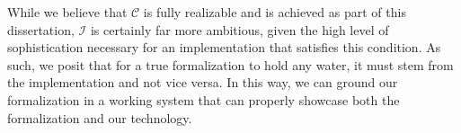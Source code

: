 While we believe that $\mathcal{C}$ is fully realizable and is
achieved as part of this dissertation, $\mathcal{I}$ is certainly far
more ambitious, given the high level of sophistication necessary for
an implementation that satisfies this condition. As such, we posit
that for a true formalization to hold any water, it must stem from the
implementation and not vice versa. In this way, we can ground our
formalization in a working system that can properly showcase both the
formalization and our technology.

\begin{comment}
\footnote{This condition may not strictly be realizable,
        but the goal is to at a minimum build systems that approach
        this ideal condition.}
\end{comment}
